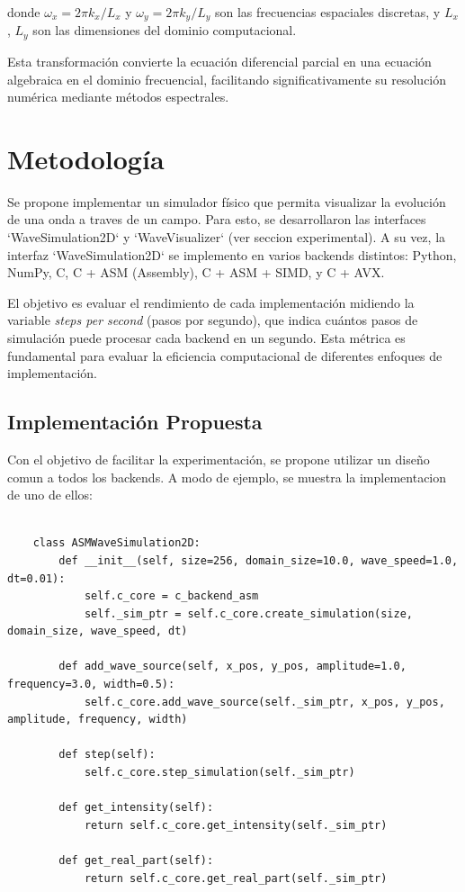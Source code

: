\documentclass[a4paper]{article}
\begin{document}
donde $\omega_x = 2\pi k_x/L_x$ y $\omega_y = 2\pi k_y/L_y$ son las frecuencias espaciales discretas, y $L_x$, $L_y$ son las
dimensiones del dominio computacional.

Esta transformación convierte la ecuación diferencial parcial en una ecuación algebraica en el dominio frecuencial, facilitando
significativamente su resolución numérica mediante métodos espectrales.

\section{Metodología}
Se propone implementar un simulador físico que permita visualizar la evolución de una onda a traves de un campo. Para esto, se desarrollaron
las interfaces `WaveSimulation2D` y `WaveVisualizer` (ver seccion experimental). A su vez, la interfaz `WaveSimulation2D` se implemento en varios
backends distintos: Python, NumPy, C, C + ASM (Assembly), C + ASM + SIMD, y C + AVX.

El objetivo es evaluar el rendimiento de cada implementación midiendo la variable \textit{steps per second} (pasos por segundo), que
indica cuántos pasos de simulación puede procesar cada backend en un segundo. Esta métrica es fundamental para evaluar la eficiencia
computacional de diferentes enfoques de implementación.

\subsection{Implementación Propuesta}
Con el objetivo de facilitar la experimentación, se propone utilizar un diseño comun a todos los backends. A modo de ejemplo, se muestra
la implementacion de uno de ellos:

\begin{verbatim}
    
    class ASMWaveSimulation2D:
        def __init__(self, size=256, domain_size=10.0, wave_speed=1.0, dt=0.01):
            self.c_core = c_backend_asm
            self._sim_ptr = self.c_core.create_simulation(size, domain_size, wave_speed, dt)
        
        def add_wave_source(self, x_pos, y_pos, amplitude=1.0, frequency=3.0, width=0.5):
            self.c_core.add_wave_source(self._sim_ptr, x_pos, y_pos, amplitude, frequency, width)
        
        def step(self):
            self.c_core.step_simulation(self._sim_ptr)
        
        def get_intensity(self):
            return self.c_core.get_intensity(self._sim_ptr)
        
        def get_real_part(self):
            return self.c_core.get_real_part(self._sim_ptr)
\end{verbatim}
\end{document}
